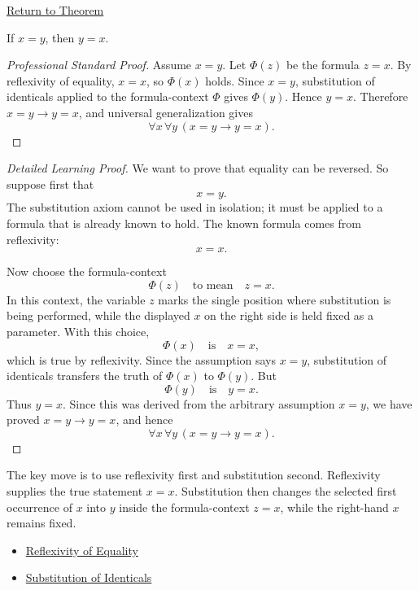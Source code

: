 \newpage
{}
\label{prf:axiomatic-equality-symmetry}

\begin{remark*}[Return]
\hyperref[thm:axiomatic-equality-symmetry]{Return to Theorem}
\end{remark*}

\begin{theorem*}
If \(x=y\), then \(y=x\).
\end{theorem*}

\begin{proof}[Professional Standard Proof]
\LRAProofBodyStart
Assume \(x=y\). Let \(\Phi(z)\) be the formula \(z=x\). By reflexivity of
equality, \(x=x\), so \(\Phi(x)\) holds. Since \(x=y\), substitution of
identicals applied to the formula-context \(\Phi\) gives \(\Phi(y)\). Hence
\(y=x\). Therefore \(x=y\to y=x\), and universal generalization gives
\[
  \forall x\,\forall y\,(x=y\to y=x).
\]
\end{proof}

\begin{proof}[Detailed Learning Proof]
\LRAProofBodyStart
We want to prove that equality can be reversed. So suppose first that
\[
  x=y.
\]
The substitution axiom cannot be used in isolation; it must be applied to a
formula that is already known to hold. The known formula comes from
reflexivity:
\[
  x=x.
\]

Now choose the formula-context
\[
  \Phi(z) \quad\text{to mean}\quad z=x.
\]
In this context, the variable \(z\) marks the single position where
substitution is being performed, while the displayed \(x\) on the right side
is held fixed as a parameter. With this choice,
\[
  \Phi(x) \quad\text{is}\quad x=x,
\]
which is true by reflexivity. Since the assumption says \(x=y\), substitution
of identicals transfers the truth of \(\Phi(x)\) to \(\Phi(y)\). But
\[
  \Phi(y) \quad\text{is}\quad y=x.
\]
Thus \(y=x\). Since this was derived from the arbitrary assumption \(x=y\), we
have proved \(x=y\to y=x\), and hence
\[
  \forall x\,\forall y\,(x=y\to y=x).
\]
\end{proof}

\begin{remark*}
The key move is to use reflexivity first and substitution second. Reflexivity
supplies the true statement \(x=x\). Substitution then changes the selected
first occurrence of \(x\) into \(y\) inside the formula-context \(z=x\), while
the right-hand \(x\) remains fixed.
\end{remark*}

\begin{dependencies}
\begin{itemize}
  \item \hyperref[ax:axiomatic-equality-reflexivity]{Reflexivity of Equality}
  \item \hyperref[ax:axiomatic-equality-substitution]{Substitution of Identicals}
\end{itemize}
\end{dependencies}

\clearpage
